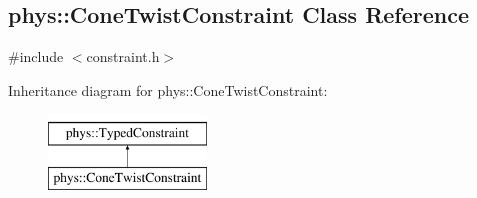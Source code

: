 \hypertarget{classphys_1_1ConeTwistConstraint}{
\subsection{phys::ConeTwistConstraint Class Reference}
\label{classphys_1_1ConeTwistConstraint}
}


{\ttfamily \#include $<$constraint.h$>$}

Inheritance diagram for phys::ConeTwistConstraint:\begin{figure}[H]
\begin{center}
\leavevmode
\includegraphics[height=2.000000cm]{classphys_1_1ConeTwistConstraint}
\end{center}
\end{figure}
